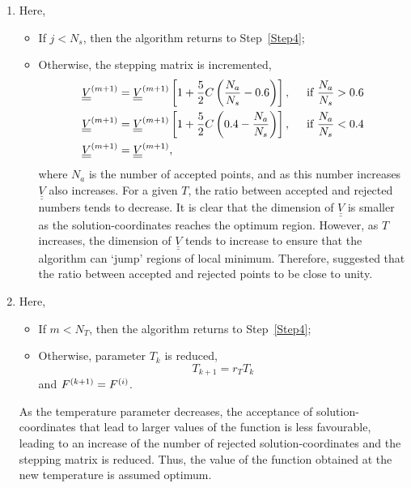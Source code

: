 \begin{enumerate}[{\bf Step 1: }]
   \item\label{Step8} Here,
       \begin{itemize}
           \item If $j<N_{s}$, then the algorithm returns to Step~\ref{Step4};
           \item Otherwise, the stepping matrix is incremented,
               \begin{subequations}
                  \begin{align}
                      & \mfr[\underline{\underline{V}}]{}{m+1} = \mfr[\underline{\underline{V}}]{}{m+1}\left[1 + \frc{5}{2}C\left(\frc{N_{a}}{N_{s}}-0.6\right)\right], \hspace{.5cm}\hfill \text{if }\frc{N_{a}}{N_{s}} > 0.6 \\
                      & \mfr[\underline{\underline{V}}]{}{m+1} = \mfr[\underline{\underline{V}}]{}{m+1}\left[1 + \frc{5}{2}C\left(0.4 - \frc{N_{a}}{N_{s}}\right)\right], \hspace{.5cm}\hfill \text{if }\frc{N_{a}}{N_{s}} < 0.4 \\ 
                      & \mfr[\underline{\underline{V}}]{}{m+1} = \mfr[\underline{\underline{V}}]{}{m+1},
                  \end{align}
               \end{subequations}
where $N_{a}$ is the number of accepted points, and as this number increases $\underline{\underline{V}}$ also increases. For a given $T$, the ratio between accepted and rejected numbers tends to decrease. It is clear that the dimension of $\underline{\underline{V}}$ is smaller as the solution-coordinates reaches the optimum region. However, as $T$ increases, the dimension of $\underline{\underline{V}}$ tends to increase to ensure that the algorithm can `jump' regions of local minimum. Therefore, \citet{Zhang_1993, Dekkers_1991,Goffe_1994} suggested that the ratio between accepted and rejected points to be close to unity.
       \end{itemize}

   \item\label{Step9} Here, 
       \begin{itemize}
           \item If $m<N_{T}$, then the algorithm returns to Step~\ref{Step4};
           \item Otherwise, parameter $T_{k}$ is reduced,
               \begin{equation}
                   T_{k+1} = r_{T} T_{k}
               \end{equation}
               and $\mfr[F]{}{k+1}=\mfr[F]{}{i}$.
       \end{itemize}
       As the temperature parameter decreases, the acceptance of solution-coordinates that lead to larger values of the function is less favourable, leading to an increase of the number of rejected solution-coordinates and the stepping matrix is reduced. Thus, the value of the function obtained at the new temperature is assumed optimum. 


\end{enumerate}
